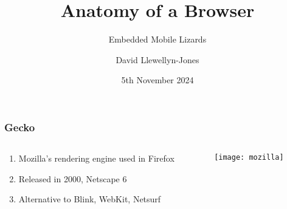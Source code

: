 \documentclass[
	notes=none,
	aspectratio=169
]{beamer}
\begin{document}
\title{Anatomy of a Browser}
\subtitle{Embedded Mobile Lizards}
\author{David Llewellyn-Jones}
\date{5th November 2024}


\renewcommand{\thefootnote}{\arabic{footnote}}

\frame{
\titlepage
}
\note{
}

\renewcommand{\thefootnote}{\fnsymbol{footnote}}


\begin{frame}
\frametitle{Gecko}

\begin{columns}[T]
\begin{column}[T]{0.6\textwidth}
\setlength{\parskip}{0.5em}

\vspace{1.5cm}
\begin{enumerate}
\setlength{\parskip}{0.5em}
\item Mozilla's rendering engine used in Firefox
\item Released in 2000, Netscape 6
\item Alternative to Blink, WebKit, Netsurf
\end{enumerate}

\end{column}
\begin{column}[T]{0.4\textwidth}
\setlength{\parskip}{0.5em}

\vspace{0.5cm}
\texttt{[image: mozilla]}

\end{column}
\end{columns}

\end{frame}

\end{document}
